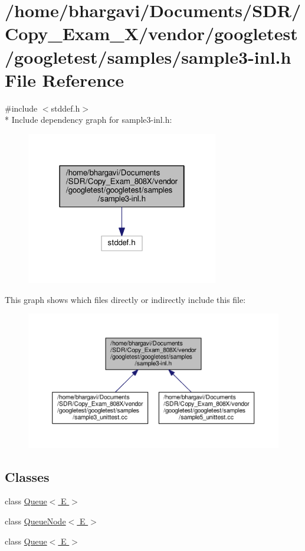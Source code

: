 \hypertarget{sample3-inl_8h}{}\section{/home/bhargavi/\+Documents/\+S\+D\+R/\+Copy\+\_\+\+Exam\+\_\+X/vendor/googletest/googletest/samples/sample3-\/inl.h File Reference}
\label{sample3-inl_8h}
{\ttfamily \#include $<$stddef.\+h$>$}\\*
Include dependency graph for sample3-\/inl.h\+:
\nopagebreak
\begin{figure}[H]
\begin{center}
\leavevmode
\includegraphics[width=238pt]{sample3-inl_8h__incl}
\end{center}
\end{figure}
This graph shows which files directly or indirectly include this file\+:
\nopagebreak
\begin{figure}[H]
\begin{center}
\leavevmode
\includegraphics[width=350pt]{sample3-inl_8h__dep__incl}
\end{center}
\end{figure}
\subsection*{Classes}
\begin{DoxyCompactItemize}
\item 
class \hyperlink{class_queue}{Queue$<$ E $>$}
\item 
class \hyperlink{class_queue_node}{Queue\+Node$<$ E $>$}
\item 
class \hyperlink{class_queue}{Queue$<$ E $>$}
\end{DoxyCompactItemize}

